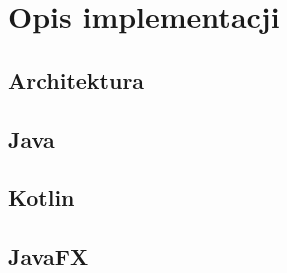 \section{Opis implementacji}
\subsection{Architektura}
\subsection{Java}
\subsection{Kotlin}
\subsection{JavaFX}
